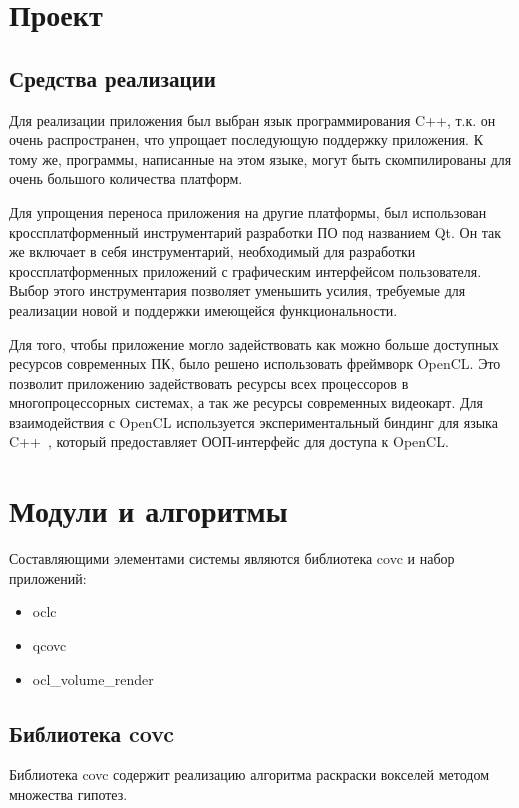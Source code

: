 \section{Проект}
\subsection{Средства реализации}
Для реализации приложения был выбран язык программирования C++, т.к. он очень распространен, что упрощает последующую поддержку приложения. К тому же, программы, написанные на этом языке, могут быть скомпилированы для очень большого количества платформ.

Для упрощения переноса приложения на другие платформы, был использован кроссплатформенный инструментарий разработки ПО под названием Qt. Он так же включает в себя инструментарий, необходимый для разработки кроссплатформенных приложений с графическим интерфейсом пользователя. Выбор этого инструментария позволяет уменьшить усилия, требуемые для реализации новой и поддержки имеющейся функциональности.

Для того, чтобы приложение могло задействовать как можно больше доступных ресурсов современных ПК, было решено использовать фреймворк OpenCL. Это позволит приложению задействовать ресурсы всех процессоров в многопроцессорных системах, а так же ресурсы современных видеокарт.
Для взаимодействия с OpenCL используется экспериментальный биндинг для языка C++~\cite{opencl_bindings}, который предоставляет ООП-интерфейс для доступа к OpenCL.

\section{Модули и алгоритмы}
Составляющими элементами системы являются библиотека covc и набор приложений:
\begin{itemize}
\item oclc
\item qcovc
\item ocl\_volume\_render
\end{itemize}


\subsection{Библиотека covc}
Библиотека covc содержит реализацию алгоритма раскраски вокселей методом множества гипотез.

